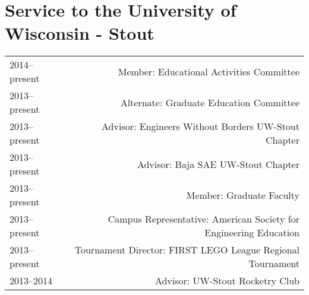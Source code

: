 \section*{Service to the University of Wisconsin - Stout}
\begin{tabular}{L!{\VRule}R}
2014--present&Member: Educational Activities Committee \\
2013--present&Alternate: Graduate Education Committee \\
2013--present&Advisor: Engineers Without Borders UW-Stout Chapter \\
2013--present&Advisor: Baja SAE UW-Stout Chapter \\
2013--present&Member: Graduate Faculty \\
2013--present&Campus Representative: American Society for Engineering Education\\
2013--present&Tournament Director: FIRST LEGO League Regional Tournament\\
2013--2014&Advisor: UW-Stout Rocketry Club\\
\end{tabular}